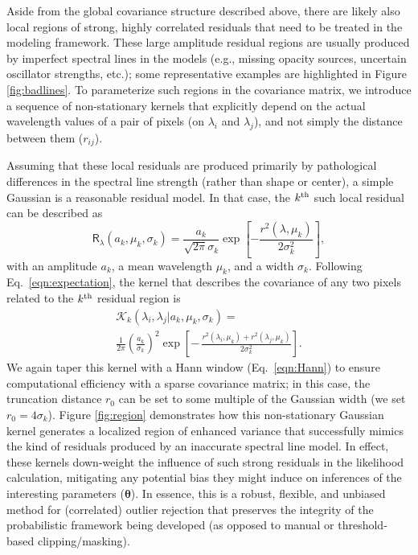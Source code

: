 \documentclass[iop,floatfix]{emulateapj}
\newcommand{\vt}{ {\bm \theta}}
\newcommand{\vR}{\mathsf{R}}
\begin{document}
Aside from the global covariance structure described above, there are likely also local regions of 
strong, highly correlated residuals that need to be treated in the modeling framework.  These large 
amplitude residual regions are usually produced by imperfect spectral lines in the models (e.g., 
missing opacity sources, uncertain oscillator strengths, etc.); some representative examples are 
highlighted in Figure \ref{fig:badlines}.  To parameterize such regions in the covariance matrix, 
we introduce a sequence of non-stationary kernels that explicitly depend on the actual wavelength 
values of a pair of pixels (on $\lambda_i$ and $\lambda_j$), and not simply the distance between 
them ($r_{ij}$).  

Assuming that these local residuals are produced primarily by pathological differences in the 
spectral line strength (rather than shape or center), a simple Gaussian is a reasonable residual 
model.  In that case, the $k^{\rm th}$ such local residual can be described as
\begin{equation}
\vR_{\lambda}(a_k, \mu_k, \sigma_k) = \frac{a_k}{\sqrt{2\pi}{\sigma_k}} \exp \left[ - \frac{r^2(\lambda,\mu_k)}{2\sigma_k^2} \right],
\end{equation}
with an amplitude $a_k$, a mean wavelength $\mu_k$, and a width $\sigma_k$.  Following 
Eq.~\ref{eqn:expectation}, the kernel that describes the covariance of any two pixels related to 
the $k^{\rm th}$ residual region is
\begin{multline}
  \mathcal{K}_k(\lambda_i, \lambda_j | a_k, \mu_k, \sigma_k) = \\
  \frac{1}{2\pi} \left(\frac{a_k}{\sigma_k}\right)^2 \exp \left [ - \, \frac{r^2(\lambda_i, \mu_k) + r^2(\lambda_j, \mu_k)}{2 \sigma_k^2}\right ].
\label{eqn:klocal}
\end{multline}
We again taper this kernel with a Hann window (Eq.~\ref{eqn:Hann}) to ensure computational 
efficiency with a sparse covariance matrix; in this case, the truncation distance $r_0$ can be set 
to some multiple of the Gaussian width (we set $r_0 = 4\sigma_k$).  
Figure \ref{fig:region} demonstrates how this non-stationary Gaussian 
kernel generates a localized region of enhanced variance that successfully mimics the kind of 
residuals produced by an inaccurate spectral line model.  In effect, these kernels down-weight the 
influence of such strong residuals in the likelihood calculation, mitigating any potential bias 
they might induce on inferences of the interesting parameters ($\vt$).  In essence, this is a 
robust, flexible, and unbiased method for (correlated) outlier rejection that preserves the 
integrity of the probabilistic framework being developed (as opposed to manual or threshold-based 
clipping/masking).  
\end{document}
